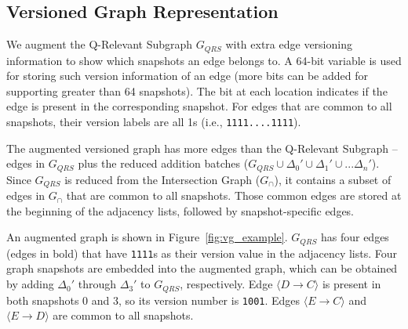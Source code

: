 
\subsection{Versioned Graph Representation}
We augment the Q-Relevant Subgraph $G_{QRS}$ with extra edge versioning information to show which snapshots an edge belongs to. A 64-bit variable is used for storing such version information of an edge (more bits can be added for supporting greater than 64 snapshots). The bit at each location indicates if the edge is present in the corresponding snapshot. For edges that are common to all snapshots, their version labels are all 1s (i.e., \texttt{1111....1111}). 

The augmented versioned graph has more edges than the Q-Relevant Subgraph -- edges in $G_{QRS}$ plus the reduced addition batches ($G_{QRS}\cup \Delta_0'\cup \Delta_1'\cup ... \Delta_{n}'$). 
Since $G_{QRS}$ is reduced from the Intersection Graph ($G_{\cap}$), it contains a subset of edges in $G_{\cap}$ that are common to all snapshots. Those 
common edges are stored at the beginning of the adjacency lists, followed by snapshot-specific edges.

An  augmented graph is shown in Figure~\ref{fig:vg_example}. 
$G_{QRS}$ has four edges (edges in bold) that have \texttt{1111}s as their version value in the adjacency lists.
Four graph snapshots are embedded into the augmented graph, which can be obtained by adding $\Delta_0'$ through $\Delta_3'$ to $G_{QRS}$, respectively.
Edge $\langle D\rightarrow C\rangle$ is present in both snapshots 0 and 3, so its version number is \texttt{1001}. Edges $\langle E\rightarrow C\rangle$ and $\langle E\rightarrow D\rangle$ are common to all snapshots. %



